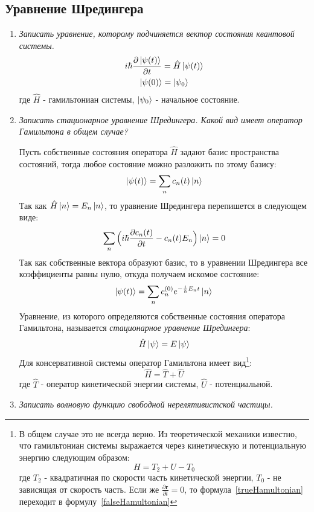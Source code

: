 \documentclass{article}
\begin{document}
\subsection*{Уравнение Шредингера}
\begin{enumerate}
	\item \textit{Записать уравнение, которому подчиняется вектор состояния квантовой системы.} 
	\begin{gather}
			i \hbar \frac{\partial \ket{\psi (t)}}{\partial t} = \hat{H} \ket{\psi (t)} \label{shrodingerEquation}\\
		\ket{\psi(0)} = \ket{\psi_0}
	\end{gather}
	где $\hat{H}$ - гамильтониан системы, $\ket{\psi_0}$ - начальное состояние.
	
	\item \textit{Записать стационарное уравнение Шредингера. Какой вид имеет оператор Гамильтона в общем случае?}
	
	Пусть собственные состояния оператора $\hat{H}$ задают базис пространства состояний, тогда любое состояние можно разложить по этому базису:
	\begin{equation}
		\ket{\psi(t)} = \sum\limits_n c_n (t) \ket{n} \label{basisDecomposition}
	\end{equation}
	Так как $\hat{H}\ket{n} = E_n \ket{n}$, то уравнение Шредингера перепишется в следующем виде:
	\begin{equation}
		\sum\limits_n \Big(i\hbar \frac{\partial c_n(t)}{\partial t} - c_n(t) E_n \Big) \ket{n} = 0
	\end{equation}
	Так как собственные вектора образуют базис, то в уравнении Шредингера все коэффициенты равны нулю, откуда получаем искомое состояние:
	\begin{equation}
		\ket{\psi(t)} = \sum\limits_n c_n^{(0)} e^{-\frac{i}{\hbar} E_n t} \ket{n}
	\end{equation}
	Уравнение, из которого определяются собственные состояния оператора Гамильтона, называется \textit{стационарное уравнение Шредингера}:
	\begin{equation}
		\hat{H} \ket{\psi} = E \ket{\psi}
	\end{equation}
	Для консервативной системы оператор Гамильтона имеет вид\footnote{В общем случае это не всегда верно. Из теоретической механики известно, что гамильтониан системы выражается через кинетическую и потенциальную энергию следующим образом:
	\begin{equation}
		H = T_2 + U - T_0 \label{trueHamultonian}
	\end{equation}
	где $T_2$ - квадратичная по скорости часть кинетической энергии, $T_0$ - не зависящая от скорость часть. Если же $\frac{\partial \textbf{r}}{\partial t} = 0$, то формула~\eqref{trueHamultonian} переходит в формулу~\eqref{falseHamultonian}
	}:
	\begin{equation}
		\hat{H} = \hat{T} + \hat{U} \label{falseHamultonian}
	\end{equation}
	где $\hat{T}$ - оператор кинетической энергии системы, $\hat{U}$ - потенциальной.
	\item \textit{Записать волновую функцию свободной нерелятивистской частицы.}
	

\end{enumerate}
\end{document}
